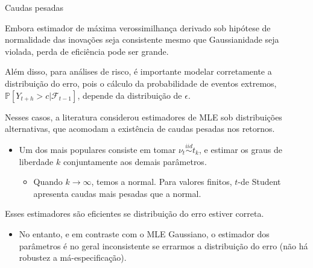 \documentclass[11pt]{beamer}
\newenvironment{halfwideitemize}{\itemize\addtolength{\itemsep}{0.5em}}{\enditemize}
\begin{document}
\begin{frame}{Caudas pesadas}
\begin{halfwideitemize}
	\item Embora estimador de máxima verossimilhança derivado sob hipótese de normalidade das inovações seja consistente mesmo que Gaussianidade seja violada, perda de eficiência pode ser grande.
	\item Além disso, para análises de risco, é importante modelar corretamente a distribuição do erro, pois o cálculo da probabilidade de eventos extremos, $\mathbb{P}[Y_{t+h} > c|\mathcal{F}_{t-1}]$, depende da distribuição de $\epsilon$.
	\item Nesses casos, a literatura considerou estimadores de MLE sob distribuições alternativas, que acomodam a existência de {\color{blue}caudas pesadas} nos retornos.  
	\begin{itemize}
		\item Um dos mais populares consiste em tomar $\nu_t \overset{iid}{\sim} t_k$, e estimar os graus de liberdade $k$ conjuntamente aos demais parâmetros.
		\begin{itemize}
			\item Quando $k\to \infty$, temos a normal. Para valores finitos, $t$-de Student apresenta caudas mais pesadas que a normal.
		\end{itemize}
	\end{itemize}
	\item Esses estimadores são eficientes se distribuição do erro estiver correta.
	\vspace{-1em}
	\begin{itemize}
		\item No entanto, e em contraste com o MLE Gaussiano, o estimador dos parâmetros é no geral inconsistente se errarmos a distribuição do erro (não há robustez a má-especificação).
	\end{itemize}
\end{halfwideitemize}
\end{frame}
\end{document}
